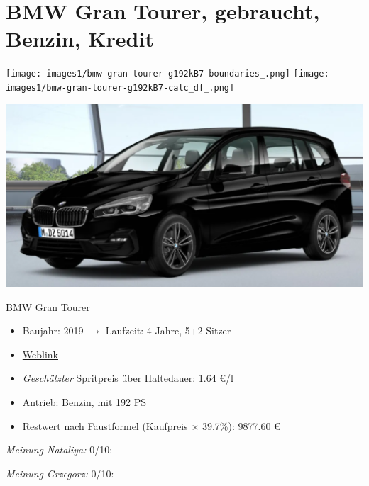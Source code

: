 \documentclass[landscape, DIV=99, 14pt]{scrartcl}
\begin{document}
\pagebreak


\twocolumn

\section*{BMW Gran Tourer, gebraucht, Benzin, Kredit}
\begin{center}
\texttt{[image: images1/bmw-gran-tourer-g192kB7-boundaries\_.png]}
\null
\vspace{0.5cm}
\texttt{[image: images1/bmw-gran-tourer-g192kB7-calc\_df\_.png]}
\end{center}

\pagebreak
\begin{center}
\includegraphics[width=0.9\columnwidth]{cars/bmw-gran-tourer-mulfinger.png}

BMW Gran Tourer
\end{center}

\begin{itemize}
    \item Baujahr: 2019 $\rightarrow$ Laufzeit: 4 Jahre, 5+2-Sitzer
    \item \href{https://mulfinger.de/de/fahrzeugangebot/BMW/220i-GranTourer-Sport-DKG-HUD-LED-ParkAssNavi/page1/details-p5clkem9?manufacturer=5&model=2534&view=list}{Weblink}
    \item \emph{Gesch\"atzter} Spritpreis \"uber Haltedauer: 1.64 \euro{}/l
    \item Antrieb: Benzin, mit 192 PS
    \item Restwert nach Faustformel (Kaufpreis $\times$ 39.7\%): 9877.60 \euro{}
\end{itemize}

\begin{small}
\emph{Meinung Nataliya:} 0/10: 
        
\emph{Meinung Grzegorz:} 0/10: 
\end{small}
\end{document}

